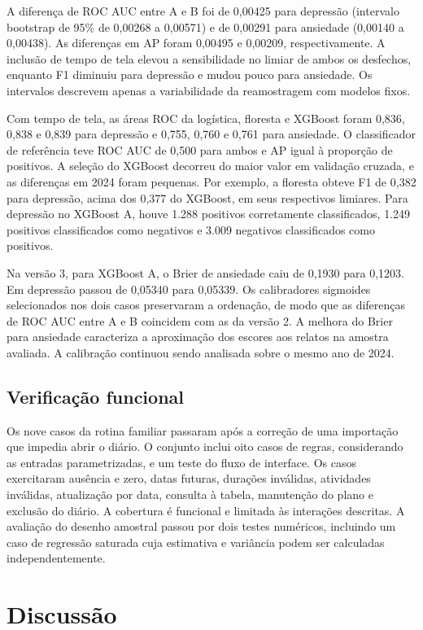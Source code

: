 ﻿\documentclass[12pt]{article}
\begin{document}
A diferença de ROC AUC entre A e B foi de 0,00425 para depressão (intervalo bootstrap de 95\% de 0,00268 a 0,00571) e de 0,00291 para ansiedade (0,00140 a 0,00438). As diferenças em AP foram 0,00495 e 0,00209, respectivamente. A inclusão de tempo de tela elevou a sensibilidade no limiar de ambos os desfechos, enquanto F1 diminuiu para depressão e mudou pouco para ansiedade. Os intervalos descrevem apenas a variabilidade da reamostragem com modelos fixos.

Com tempo de tela, as áreas ROC da logística, floresta e XGBoost foram 0,836, 0,838 e 0,839 para depressão e 0,755, 0,760 e 0,761 para ansiedade. O classificador de referência teve ROC AUC de 0,500 para ambos e AP igual à proporção de positivos. A seleção do XGBoost decorreu do maior valor em validação cruzada, e as diferenças em 2024 foram pequenas. Por exemplo, a floresta obteve F1 de 0,382 para depressão, acima dos 0,377 do XGBoost, em seus respectivos limiares. Para depressão no XGBoost A, houve 1.288 positivos corretamente classificados, 1.249 positivos classificados como negativos e 3.009 negativos classificados como positivos.

Na versão 3, para XGBoost A, o Brier de ansiedade caiu de 0,1930 para 0,1203. Em depressão passou de 0,05340 para 0,05339. Os calibradores sigmoides selecionados nos dois casos preservaram a ordenação, de modo que as diferenças de ROC AUC entre A e B coincidem com as da versão 2. A melhora do Brier para ansiedade caracteriza a aproximação dos escores aos relatos na amostra avaliada. A calibração continuou sendo analisada sobre o mesmo ano de 2024.

\subsection{Verificação funcional}
Os nove casos da rotina familiar passaram após a correção de uma importação que impedia abrir o diário. O conjunto inclui oito casos de regras, considerando as entradas parametrizadas, e um teste do fluxo de interface. Os casos exercitaram ausência e zero, datas futuras, durações inválidas, atividades inválidas, atualização por data, consulta à tabela, manutenção do plano e exclusão do diário. A cobertura é funcional e limitada às interações descritas. A avaliação do desenho amostral passou por dois testes numéricos, incluindo um caso de regressão saturada cuja estimativa e variância podem ser calculadas independentemente.

\section{Discussão}
\end{document}
